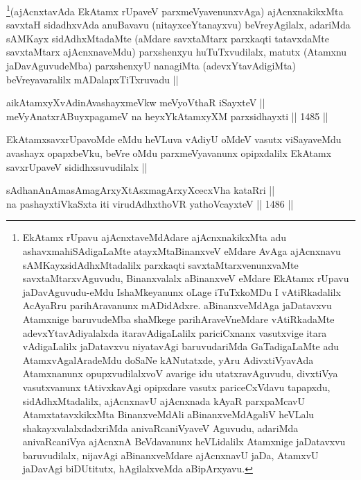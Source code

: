 \begin{artha}
\footnote{EkAtamx rUpavu ajAcnxtaveMdAdare ajAcnxnakikxMta adu ashavxmahiSAdigaLaMte atayxMtaBinanxveV eMdare AvAga ajAcnxnavu sAMKayxsidAdhxMtadalilx parxkaqti savxtaMtarxvenunxvaMte savxtaMtarxvAguvudu, Binanxvalalx aBinanxveV eMdare EkAtamx rUpavu jaDavAguvudu-eMdu IshaMkeyanunx oLage iTuTxkoMDu I vAtiRkadalilx AcAyaRru parihAravanunx mADidAdxre. aBinanxveMdAga jaDatavxvu Atamxnige baruvudeMba shaMkege parihAraveVneMdare vAtiRkadaMte adevxYtavAdiyalalxda itaravAdigaLalilx pariciCxnanx vasutxvige itara vAdigaLalilx jaDatavxvu niyatavAgi baruvudariMda GaTadigaLaMte adu AtamxvAgalAradeMdu doSaNe kANutatxde, yAru AdivxtiVyavAda Atamxnanunx opupxvudilalxvoV avarige idu utatxravAguvudu, divxtiVya vasutxvanunx tAtivxkavAgi opipxdare vasutx pariceCxVdavu tapapxdu, sidAdhxMtadalilx, ajAcnxnavU ajAcnxnada kAyaR parxpaMcavU AtamxtatavxkikxMta BinanxveMdAli aBinanxveMdAgaliV heVLalu shakayxvalalxdadxriMda anivaRcaniVyaveV Aguvudu, adariMda anivaRcaniVya ajAcnxnA BeVdavanunx heVLidalilx Atamxnige jaDatavxvu baruvudilalx, nijavAgi aBinanxveMdare ajAcnxnavU jaDa, AtamxvU jaDavAgi biDUtitutx, hAgilalxveMda aBipArxyavu.}(ajAcnxtavAda EkAtamx rUpaveV parxmeVyavenunxvAga) ajAcnxnakikxMta savxtaH sidadhxvAda anuBavavu (nitayxceYtanayxvu) beVreyAgilalx, adariMda sAMKayx sidAdhxMtadaMte (aMdare savxtaMtarx parxkaqti tatavxdaMte savxtaMtarx ajAcnxnaveMdu) parxshenxyu huTuTxvudilalx, matutx (Atamxnu jaDavAguvudeMba) parxshenxyU nanagiMta (adevxYtavAdigiMta) beVreyavaralilx mADalapxTiTxruvadu ||
\end{artha}


\begin{shl}
aikAtamxyXvAdinA\s vashayxmeVkw meVyoV\s thaR iSayxteV ||  \\
meVyAnatxrABuyxpagameV na heyxYkAtamxyXM parxsidhayxti ||  1485 ||  
\end{shl}

\begin{artha}
EkAtamxsavxrUpavoMde eMdu heVLuva vAdiyU oMdeV vasutx viSayaveMdu avashayx opapxbeVku, beVre oMdu parxmeVyavanunx opipxdalilx EkAtamx savxrUpaveV sididhxsuvudilalx ||
\end{artha}

\begin{shl}
sAdhanAnAmasAmagArxyXtAsxmagArxyXcecxVha kataRri || \\
na pashayxtiVkaSxta iti virudAdhxthoVR yathoVcayxteV ||  1486 ||  
\end{shl}
				

